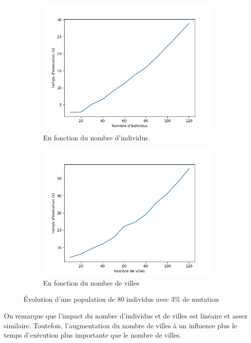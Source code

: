 \documentclass[11pt]{article}
\begin{document}
\begin{figure}[h]
    \begin{subfigure}{.5\textwidth}
        \includegraphics[width=.9\linewidth]{./time.png}
        \caption{En fonction du nombre d'individus.}
    \end{subfigure}
    \begin{subfigure}{.5\textwidth}
        \includegraphics[width=.9\linewidth]{./cities.png}
        \caption{En fonction du nombre de villes}
    \end{subfigure}
    \caption{Évolution d'une population de 80 individus avec 3\% de mutation}
\end{figure}

On remarque que l'impact du nombre d'individus et de villes est linéaire et assez similaire. Toutefois,
l'augmentation du nombre de villes à un influence plus le temps d'exécution plus importante que
le nombre de villes.
\end{document}
